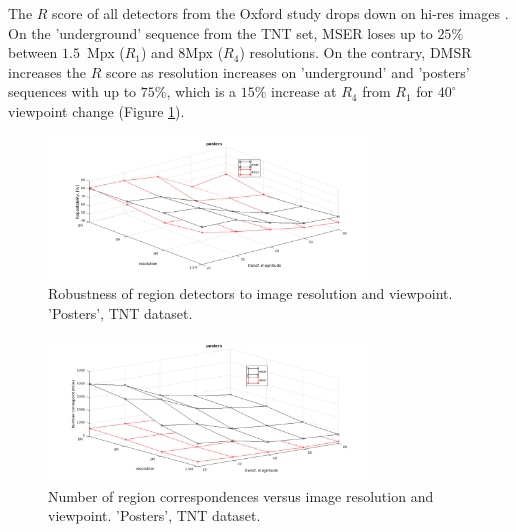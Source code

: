 \documentclass{article}
\begin{document}
The $R$ score of all detectors from the Oxford study drops down on hi-res images \cite{CorRos2013}. On the 'underground' sequence from the TNT set, MSER loses up to $25\%$ between $1.5$~Mpx ($R_1$) and $8$Mpx ($R_4$) resolutions. On the contrary, DMSR increases the $R$ score as resolution increases on 'underground' and 'posters' sequences with up to $75\%$, which is a $15\%$ increase at $R_4$ from $R_1$ for $40^{\circ}$ viewpoint change (Figure \ref{fig:tnt}). 

\begin{figure}[htb]

\begin{minipage}[b]{.9\linewidth}
  \centering
  \centerline{\includegraphics[width=8.5cm]{./Figs/posters_rep}}
\end{minipage}
\hfill
\caption{Robustness of region detectors to image resolution and viewpoint. 'Posters', TNT dataset.}
\label{fig:tnt}
\vspace{-0.25cm}
\end{figure}
\begin{figure}[htb]

\begin{minipage}[b]{0.9\linewidth}
  \centering
  \centerline{\includegraphics[width=8.5cm]{./Figs/posters_numreg}}
\end{minipage}
\caption{Number of region correspondences versus image resolution and viewpoint. 'Posters', TNT dataset.}
\label{fig:tnt_numreg}
%
\end{figure}
\end{document}
